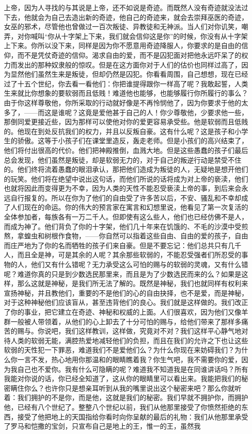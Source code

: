 上帝，因为人寻找的与其说是上帝，还不如说是奇迹。而既然人没有奇迹就没法过下去，他就会为自己去造出新的奇迹，他自己的奇迹来，就会去崇拜巫医的奇迹，女巫的邪术，尽管他也曾做过一百次叛徒、异教徒和无神派。当人们对你讥笑，嘲弄，对你喊叫“你从十字架上下来，我们就会信仰这是你”的时候，你没有从十字架上下来。你所以没下来，同样是因为你不愿意用奇迹降服人，你要求的是自由的信仰，而不是凭仗奇迹的信仰。渴求自由的爱，而不是囚犯面对把他永远吓呆了的权力而发出的那种奴隶般的惊叹。但是在这方面你对于人们的估价也同样过高了，因为显然他们虽然生来是叛徒，但却仍然是囚犯。你看看周围，自己想想，现在已经过了十五个世纪，你去看一看他们：你把谁提得跟你一样高了呢？我敢起誓，人类生来就比你想象的要软弱而且低贱！难道他也能够，也能够履行你所履行的事么？由于你这样尊敬他，你所采取的行动就好像是不再怜悯他了，因为你要求于他的太多了，——而这是谁呢？这竟是爱他甚于自己的人！你少尊敬他，少要求他一些，那倒同爱更接近些，因为那样可以使他对你的爱更容易承受些。他是软弱而且低贱的。他现在到处反抗我们的权力，并且以反叛自豪。这有什么呢？这是孩子和小学生的骄傲。这等于小孩子们在课堂里造反，轰走老师。但是小孩们的高兴结束了，他们将付出很高的代价。他们把神殿推倒，血溅大地。但是这些愚蠢的孩子们最后总会发现，他们虽然是叛徒，却是软弱无力的，对于自己的叛逆行动是禁受不住的。他们终将流着愚蠢的眼泪承认，那把他们造成为叛徒的人，无疑地是想开他们的玩笑。他们将在绝望中说出这句话，而他们所说的话将成为对上帝的亵渎，他们也就将因此而变得更为不幸，因为人类的天性不能忍受亵渎上帝的事，到后来会永远自行报复的。所以在你为了他们的自由受了许多苦以后，不安、骚乱和不幸却成了人们现在的命运。你的伟大的预言家在寓言和幻想里说，他看见了第一次复活的全体参加者，每族各有一万二千人。但即使有这么些人，他们也已经仿佛不是人，而成为神了。他们背负了你的十字架，他们几十年来在饥饿的、不毛的沙漠中受煎熬，拿蝗虫和树根作食物，——你自然可以指着这些自由、自由的爱的孩子，自由而庄严地为了你的名而牺牲的孩子们来自豪。但是不要忘记：他们总共只有几千人，而且全是神，可是其余的人呢？其余那些软弱的，不能忍受强者们所忍受的事物的人，他们又有什么错呢？无力承受这么可怕的赐与的软弱的灵魂，又有什么错呢？难道你真的只是到少数选民那里来，而且是为了少数选民而来的么？如果是这样，那么这就是神秘，是我们所无法了解的。既然是神秘，我们也就同样有权利来宣扬神秘，并且教他们，重要的不是他们的心的自由抉择，也不是爱，而是神秘，对于这种神秘他们应该盲从，甚至违背他们的良心。我们就是这样做的。我们改正了你的事业，把它建立在奇迹、神秘和权威的上面。人们很喜欢，因为他们又像羊群一般被人带领着，从他们的心上卸去了十分可怕的赐与，给他们带来了那样多痛苦的赐与。你说吧，我们这样教训，这样做，究竟对不对？我们这样平心静气地对待人类的软弱无能，满腔热爱地减轻他们的负担，而且在我们的允许之下也让这些软弱的天性犯一下罪恶，难道我们不是爱他们么？为什么你现在来妨碍我们？为什么你一言不发，热心地用你那温和的眼睛瞧着我？你生气吧，我不需要你的爱，因为我自己也不爱你。我有什么可隐瞒的呢？难道我不知道我是在同谁讲话吗？所有我能对你说的话，你已经全知道了，这从你的眼睛里可以看出来。我能把我们的秘密瞒住你么？也许你只是想亲耳听到从我的嘴里说出这个秘密来吧？那么你就听着：我们拥护的不是你，而是他，这就是我们的秘密。我们早就不拥护你，而拥护他，已经有八个世纪了。整整八个世纪以前，我们从他那里接受了你愤然拒绝的东西，接受了他把地上的天国指给你看时向你呈献的最后的礼物：我们从他那里承受了罗马和恺撒的宝剑，只宣布自己是地上的王，惟一的王，虽然我